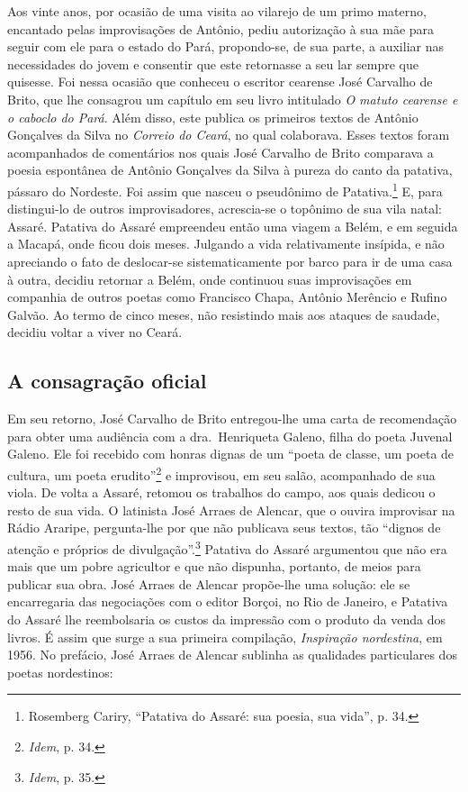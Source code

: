 Aos vinte anos, por ocasião de uma visita ao vilarejo de um primo materno,
encantado pelas improvisações de Antônio, pediu autorização à sua mãe para
seguir com ele para o estado do Pará, propondo-se, de sua parte, a auxiliar nas
necessidades do jovem e consentir que este retornasse a seu lar sempre que
quisesse. Foi nessa ocasião que conheceu o escritor cearense José Carvalho de
Brito, que lhe consagrou um capítulo em seu livro intitulado \textit{O matuto cearense e
o caboclo do Pará}. Além disso, este publica os primeiros textos de Antônio
Gonçalves da Silva no \textit{Correio do Ceará}, no qual colaborava. Esses textos foram
acompanhados de comentários nos quais José Carvalho de Brito comparava a poesia
espontânea de Antônio Gonçalves da Silva à pureza do canto da patativa, pássaro
do Nordeste. Foi assim que nasceu o pseudônimo de Patativa.\footnote{ Rosemberg
Cariry, “Patativa do Assaré: sua poesia, sua vida”, p. 34.} E, para
distingui-lo de outros improvisadores, acrescia-se o topônimo de sua vila natal:
Assaré. Patativa do Assaré empreendeu então uma viagem a Belém, e em seguida a
Macapá, onde ficou dois meses. Julgando a vida relativamente insípida, e não
apreciando o fato de deslocar-se sistematicamente por barco para ir de uma casa
à outra, decidiu retornar a Belém, onde continuou suas improvisações em
companhia de outros poetas como Francisco Chapa, Antônio Merêncio e Rufino
Galvão. Ao termo de cinco meses, não resistindo mais aos ataques de saudade,
decidiu voltar a viver no Ceará.

\subsection{A consagração oficial}

Em seu retorno, José Carvalho de Brito entregou-lhe uma carta de recomendação
para obter uma audiência com a dra.~Henriqueta Galeno, filha do poeta Juvenal
Galeno. Ele foi recebido com honras dignas de um “poeta de classe, um poeta de
cultura, um poeta erudito”\footnote{ \textit{Idem}, p. 34.} e improvisou, em seu
salão, acompanhado de sua viola. De volta a Assaré, retomou os trabalhos do
campo, aos quais dedicou o resto de sua vida. O latinista José Arraes de
Alencar, que o ouvira improvisar na Rádio Araripe, pergunta-lhe por que não
publicava seus textos, tão “dignos de atenção e próprios de
divulgação”.\footnote{ \textit{Idem}, p. 35.} Patativa do Assaré argumentou que
não era mais que um pobre agricultor e que não dispunha, portanto, de meios para
publicar sua obra. José Arraes de Alencar propõe-lhe uma solução: ele se
encarregaria das negociações com o editor Borçoi, no Rio de Janeiro, e Patativa
do Assaré lhe reembolsaria os custos da impressão com o produto da venda dos
livros. É assim que surge a sua primeira compilação, \textit{Inspiração nordestina}, em
1956. No prefácio, José Arraes de Alencar sublinha as qualidades particulares
dos poetas nordestinos:

